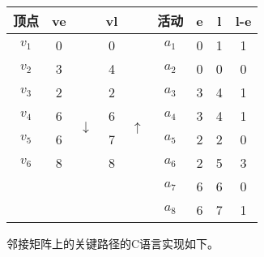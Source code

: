 \begin{center}
\label{tab:criticalpath}
\begin{tabular}{|ccccc|cccc|}
\hline
\textbf{顶点} & \textbf{ve} & & \textbf{vl} & & \textbf{活动} & \textbf{e} & \textbf{l} & \textbf{l-e} \\
\hline
$v_1$ & 0 & \multirow{8}{*}{$\downarrow$} & 0 & \multirow{8}{*}{$\uparrow$} & $a_1$ & 0 & 1 & 1 \\
$v_2$ & 3 &                               & 4 &                             & $a_2$ & 0 & 0 & 0 \\
$v_3$ & 2 &                               & 2 &                             & $a_3$ & 3 & 4 & 1 \\
$v_4$ & 6 &                               & 6 &                             & $a_4$ & 3 & 4 & 1 \\
$v_5$ & 6 &                               & 7 &                             & $a_5$ & 2 & 2 & 0 \\
$v_6$ & 8 &                               & 8 &                             & $a_6$ & 2 & 5 & 3 \\
      &   &                               &   &                             & $a_7$ & 6 & 6 & 0 \\
      &   &                               &   &                             & $a_8$ & 6 & 7 & 1 \\
\hline
\end{tabular}
\end{center}


邻接矩阵上的关键路径的C语言实现如下。

